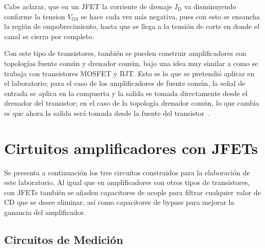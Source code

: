 \documentclass[journal]{IEEEtran}
\begin{document}
Cabe aclarar, que en un JFET la corriente de drenaje $I_{\text{D}}$ va disminuyendo conforme la tension $V_{\text{GS}}$ se
hace cada vez más negativa, pues con esto se ensancha la región de empobrecimiento, hasta que se llega a la tensión 
de corte en donde el canal se cierra por completo.

Con este tipo de transistores, también se pueden construir amplificadores con topologías fuente común y 
drenador común, bajo una idea muy similar a como se trabaja con transistores MOSFET y BJT. Esto es lo que se pretendió 
aplicar en el laboratorio; para el caso de los amplificadores de fuente común, la señal de entrada se aplica en la compuerta
y la salida es tomada directamente desde el drenador del transistor; en el caso de la topología drenador común, lo que cambia
es que ahora la salida será tomada desde la fuente del transistor~\cite{Floyd}.

\section{Cirtuitos amplificadores con JFETs}
Se presenta a continuación los tres circuitos construidos para la elaboración de este laboratorio. Al igual que en
amplificadores con otros tipos de transistores, con JFETs también se añaden capacitores de acople para filtrar
cualquier valor de CD que se desee eliminar, así como capacitores de bypass para mejorar la ganancia del amplificador.


\subsection{Circuitos de Medición}
\end{document}
